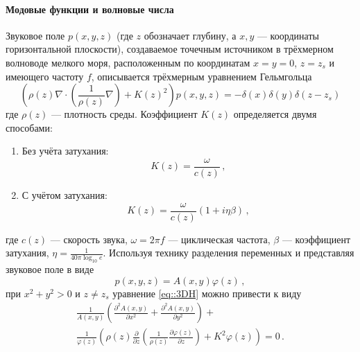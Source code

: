 \documentclass{fefu}
\newcommand{\pa}[1]{\left(#1\right)}
\begin{document}
                \paragraph{Модовые функции и волновые числа}
                    \par Звуковое поле $p\pa{x,y,z}$ (где $z$ обозначает глубину, а  $x,y$ --- координаты горизонтальной плоскости), создаваемое точечным источником в трёхмерном волноводе мелкого моря, расположенным по координатам $x=y=0$, $z=z_s$ и имеющего частоту $f$, описывается трёхмерным уравнением Гельмгольца \cite{jensen}
                    \begin{equation}\label{eq::3DH}
                        \pa{\rho\pa{z}\nabla\cdot\pa{\frac{1}{\rho\pa{z}}\nabla} + K\pa{z}^2}p\pa{x,y,z}=-\delta\pa{x}\delta\pa{y}\delta\pa{z-z_s}
                    \end{equation}
                    где $\rho\pa{z}$ --- плотность среды. Коэффициент $K\pa{z}$ определяется двумя способами:
                    \begin{enumerate}
                        \item Без учёта затухания:
                            \begin{equation}\label{eq::K1}
                                K\pa{z}=\frac{\omega}{c\pa{z}}\,,
                            \end{equation}
                        \item С учётом затухания:
                            \begin{equation}\label{eq::K2}
                                K\pa{z}=\frac{\omega}{c\pa{z}}\pa{1+i\eta\beta}\,,
                            \end{equation}
                    \end{enumerate}
                    где $c\pa{z}$ --- скорость звука, $\omega=2\pi f$ --- циклическая частота, $\beta$ --- коэффициент затухания, $\eta=\frac{1}{40\pi\log_{10}e}$. Используя технику разделения переменных и представляя звуковое поле в виде
                    \begin{equation}
                        p\pa{x,y,z}=A\pa{x,y}\varphi\pa{z}\,,
                    \end{equation}
                    при $x^2+y^2>0$ и $z\ne z_s$ уравнение \eqref{eq::3DH} можно привести к виду
                    \begin{multline}\label{eq::Sep3DH}
                        \frac{1}{A\pa{x,y}}\pa{\frac{\partial^2 A\pa{x,y}}{\partial x^2}+\frac{\partial^2 A\pa{x,y}}{\partial y^2}}+\\
                        \frac{1}{\varphi\pa{z}}\pa{\rho\pa{z}\frac{\partial}{\partial z}\pa{\frac{1}{\rho\pa{z}}\frac{\partial\varphi\pa{z}}{\partial z}}+K^2\varphi\pa{z}}=0\,.
                    \end{multline}
\end{document}
